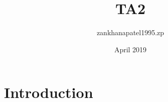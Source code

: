 \documentclass{article}
\title{TA2}
\author{zankhanapatel1995.zp }
\date{April 2019}
\begin{document}
\maketitle

\section{Introduction}
\end{document}
